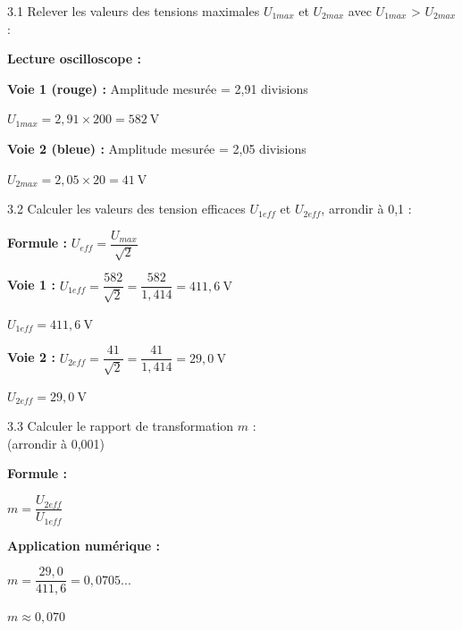 \documentclass[11pt,a4paper]{article}
\begin{document}
3.1 Relever les valeurs des tensions maximales $U_{1 max}$ et $U_{2 max} $ avec $U_{1 max}$ > $U_{2 max}$: 

\begin{tcolorbox}[colback=red!5!white,colframe=red!75!black]
\textbf{Lecture oscilloscope :}

\vspace{2mm}

\textbf{Voie 1 (rouge) :} Amplitude mesurée = 2,91 divisions

$U_{1max} = 2,91 \times 200 = \boxed{582~\text{V}}$

\vspace{2mm}

\textbf{Voie 2 (bleue) :} Amplitude mesurée = 2,05 divisions

$U_{2max} = 2,05 \times 20 = \boxed{41~\text{V}}$
\end{tcolorbox}

 \newpage 
 
3.2 Calculer les valeurs des tension efficaces $U_{1 eff}$ et $U_{2 eff} $, arrondir à 0,1 : 

\begin{tcolorbox}[colback=red!5!white,colframe=red!75!black]
\textbf{Formule :} $U_{eff} = \dfrac{U_{max}}{\sqrt{2}}$

\vspace{2mm}

\textbf{Voie 1 :} $U_{1eff} = \dfrac{582}{\sqrt{2}} = \dfrac{582}{1,414} = 411,6~\text{V}$

$U_{1eff} = \boxed{411,6~\text{V}}$

\vspace{2mm}

\textbf{Voie 2 :} $U_{2eff} = \dfrac{41}{\sqrt{2}} = \dfrac{41}{1,414} = 29,0~\text{V}$

$U_{2eff} = \boxed{29,0~\text{V}}$
\end{tcolorbox}



\begin{minipage}{.50\textwidth}%
3.3 Calculer le rapport de transformation $m$ : \\(arrondir à 0,001) 
\end{minipage}%
\hfill
\begin{minipage}{.40\textwidth}%
\begin{tcolorbox}[colback=red!5!white,colframe=red!75!black]
\textbf{Formule :}

$m = \dfrac{U_{2eff}}{U_{1eff}}$

\vspace{2mm}

\textbf{Application numérique :}

$m = \dfrac{29,0}{411,6} = 0,0705...$

\vspace{2mm}

$m \approx \boxed{0,070}$
\end{tcolorbox}
\end{minipage}%
\end{document}

